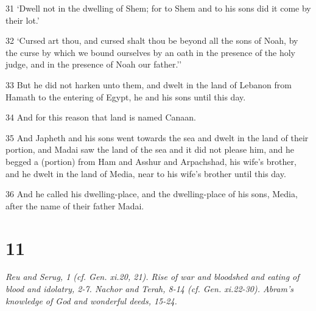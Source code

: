 \par 31 ‘Dwell not in the dwelling of Shem; for to Shem and to his sons did it come by their lot.’
\par 32 ‘Cursed art thou, and cursed shalt thou be beyond all the sons of Noah, by the curse by which we bound ourselves by an oath in the presence of the holy judge, and in the presence of Noah our father.’'
\par 33 But he did not harken unto them, and dwelt in the land of Lebanon from Hamath to the entering of Egypt, he and his sons until this day.
\par 34 And for this reason that land is named Canaan.
\par 35 And Japheth and his sons went towards the sea and dwelt in the land of their portion, and Madai saw the land of the sea and it did not please him, and he begged a (portion) from Ham and Asshur and Arpachshad, his wife's brother, and he dwelt in the land of Media, near to his wife's brother until this day.
\par 36 And he called his dwelling-place, and the dwelling-place of his sons, Media, after the name of their father Madai.

\chapter{11}

\par \textit{Reu and Serug, 1 (cf. Gen. xi.20, 21). Rise of war and bloodshed and eating of blood and idolatry, 2-7. Nachor and Terah, 8-14 (cf. Gen. xi.22-30). Abram's knowledge of God and wonderful deeds, 15-24.}

